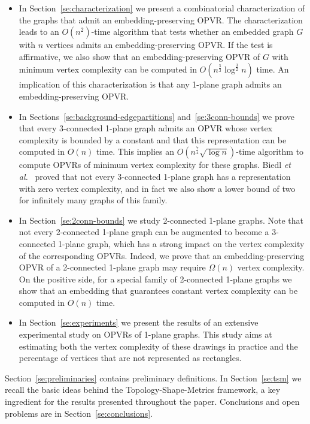 \documentclass{article}
\newcommand{\opvr}{OPVR\xspace}
\begin{document}
\begin{itemize}

\item In Section~\ref{se:characterization} we present a combinatorial characterization of the graphs that admit an embedding-preserving \opvr. The characterization leads to an $O(n^2)$-time algorithm that tests whether an embedded graph $G$ with $n$ vertices admits an embedding-preserving \opvr. If the test is affirmative, we also show that an embedding-preserving \opvr of $G$ with minimum vertex complexity can be computed in $O(n^\frac{5}{2} \log^\frac{3}{2}n)$ time. An implication of this characterization is that any 1-plane graph admits an embedding-preserving \opvr.

\item In Sections~\ref{se:background-edgepartitions} and~\ref{se:3conn-bounds} we prove that every 3-connected 1-plane graph admits an \opvr whose vertex complexity is bounded by a constant and that this representation can be computed in $O(n)$ time. This implies an $O(n^{\frac{7}{4}}\sqrt{\log n})$-time algorithm to compute {\opvr}s of minimum vertex complexity for these graphs. Biedl {\em et al.}~\cite{SoCG} proved that not every 3-connected 1-plane graph has a representation with zero vertex complexity, and in fact we also show a lower bound of two for infinitely many graphs of this family.

\item In Section~\ref{se:2conn-bounds} we study 2-connected 1-plane graphs. Note that not every 2-connected 1-plane graph can be augmented to become a 3-connected 1-plane graph, which has a strong impact on the vertex complexity of the corresponding {\opvr}s. Indeed, we prove that an embedding-preserving {\opvr} of a 2-connected 1-plane graph may require $\Omega(n)$ vertex complexity. On the positive side, for a special family of 2-connected 1-plane graphs we show that an embedding that guarantees constant vertex complexity can be computed in $O(n)$ time.

\item In Section~\ref{se:experiments} we present the results of an extensive experimental study on {\opvr}s of 1-plane graphs. This study aims at estimating both the vertex complexity of these drawings in practice and the percentage of vertices that are not represented as rectangles.
\end{itemize}

Section~\ref{se:preliminaries} contains preliminary definitions. In Section~\ref{se:tsm} we recall the basic ideas behind the Topology-Shape-Metrics framework, a key ingredient for the results presented throughout the paper. Conclusions and open problems are in Section~\ref{se:conclusions}.
\end{document}
